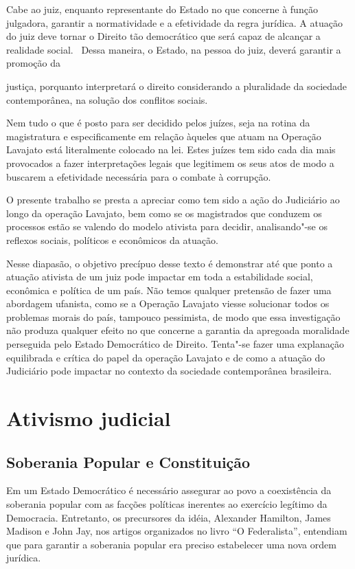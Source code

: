 {Cabe ao juiz, enquanto representante do Estado no que concerne à função
julgadora, garantir a normatividade e a efetividade da regra jurídica. A
atuação do juiz deve tornar o Direito tão democrático que será capaz de
alcançar a realidade social.~ Dessa maneira, o Estado, na pessoa do
juiz, deverá garantir a promoção da

justiça, porquanto interpretará o direito considerando a pluralidade da
sociedade contemporânea, na solução dos conflitos sociais.

Nem tudo o que é posto para ser decidido pelos juízes, seja na rotina da
magistratura e especificamente em relação àqueles que atuam na Operação
Lavajato está literalmente colocado na lei. Estes juízes tem sido cada
dia mais provocados a fazer interpretações legais que legitimem os seus
atos de modo a buscarem a efetividade necessária para o combate à
corrupção.

O presente trabalho se presta a apreciar como tem sido a ação do
Judiciário ao longo da operação Lavajato, bem como se os magistrados que
conduzem os processos estão se valendo do modelo ativista para decidir,
analisando"-se os reflexos sociais, políticos e econômicos da atuação.

Nesse diapasão, o objetivo precípuo desse texto é demonstrar até que
ponto a atuação ativista de um juiz pode impactar em toda a estabilidade
social, econômica e política de um país. Não temos qualquer pretensão de
fazer uma abordagem ufanista, como se a Operação Lavajato viesse
solucionar todos os problemas morais do país, tampouco pessimista, de
modo que essa investigação não produza qualquer efeito no que concerne a
garantia da apregoada moralidade perseguida pelo Estado Democrático de
Direito. Tenta"-se fazer uma explanação equilibrada e crítica do papel da
operação Lavajato e de como a atuação do Judiciário pode impactar no
contexto da sociedade contemporânea brasileira.

\section{Ativismo judicial}

\subsection{Soberania Popular e Constituição}

Em um Estado Democrático é necessário assegurar ao povo a coexistência
da soberania popular com as facções políticas inerentes ao exercício
legítimo da Democracia. Entretanto, os precursores da idéia, Alexander
Hamilton, James Madison e John Jay, nos artigos organizados no livro ``O
Federalista'', entendiam que para garantir a soberania popular era
preciso estabelecer uma nova ordem jurídica.

}
